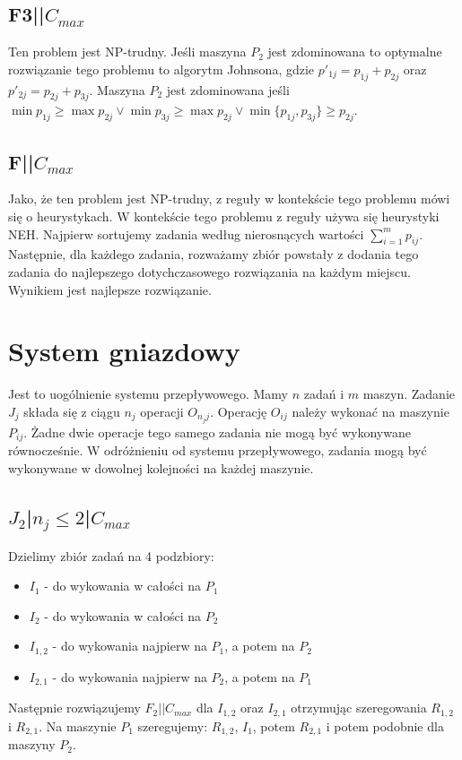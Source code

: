 \documentclass{../notatki}
\begin{document}
\subsection{F3||\texorpdfstring{$C_{max}$}{Cmax}}

Ten problem jest NP-trudny. Jeśli maszyna $P_2$ jest zdominowana to optymalne
rozwiązanie tego problemu to algorytm Johnsona, gdzie $p'_{1j} =
p_{1j} + p_{2j}$ oraz $p'_{2j} = p_{2j} + p_{3j}$. Maszyna $P_2$ jest
zdominowana jeśli
$\min p_{1j} \ge \max p_{2j} \vee \min p_{3j} \ge \max p_{2j} \vee
\min\{p_{1j},p_{3j}\} \ge p_{2j}$.

\subsection{F||\texorpdfstring{$C_{max}$}{Cmax}}

Jako, że ten problem jest NP-trudny, z reguły w kontekście tego problemu
mówi się o heurystykach. W kontekście tego problemu z reguły używa
się heurystyki NEH. Najpierw sortujemy zadania według nierosnących wartości
$\sum_{i=1}^m p_{ij}$. Następnie, dla każdego zadania, rozważamy zbiór
powstały z dodania tego zadania do najlepszego dotychczasowego rozwiązania na
każdym miejscu. Wynikiem jest najlepsze rozwiązanie.

\section{System gniazdowy}

Jest to uogólnienie systemu przepływowego. Mamy $n$ zadań i $m$ maszyn.
Zadanie $J_j$ składa się z ciągu $n_j$ operacji $O_{n_j j}$. Operację $O_{ij}$
należy wykonać na maszynie $P_{ij}$. Żadne dwie operacje tego samego zadania
nie mogą być wykonywane równocześnie. W odróżnieniu od systemu przepływowego,
zadania mogą być wykonywane w dowolnej kolejności na każdej maszynie.

\subsection{\texorpdfstring{$J_2$|$n_j \leq 2$|$C_{max}$}{J2|nj<=2|Cmax}}

Dzielimy zbiór zadań na 4 podzbiory:
\begin{itemize}
  \item $I_1$ - do wykowania w całości na $P_1$
  \item $I_2$ - do wykowania w całości na $P_2$
  \item $I_{1,2}$ - do wykowania najpierw na $P_1$, a potem na $P_2$
  \item $I_{2,1}$ - do wykowania najpierw na $P_2$, a potem na $P_1$
\end{itemize}
Następnie rozwiązujemy $F_2||C_{max}$ dla $I_{1,2}$ oraz $I_{2,1}$ otrzymując
szeregowania $R_{1,2}$ i $R_{2,1}$.
Na maszynie $P_1$ szeregujemy: $R_{1,2}$, $I_1$, potem $R_{2,1}$ i potem
podobnie dla maszyny $P_2$.
\end{document}
